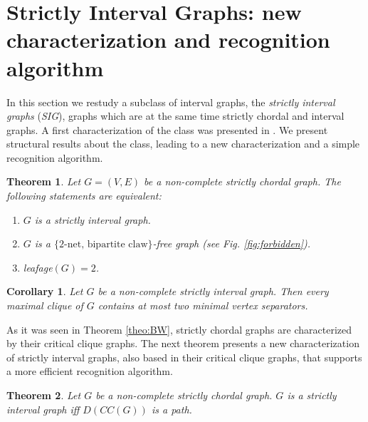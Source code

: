 \documentclass[preprint,12pt]{elsarticle}
\newtheorem{theorem}{Theorem}
\newtheorem{corollary}{Corollary}[theorem]
\begin{document}
\section{Strictly Interval Graphs: new characterization and recognition algorithm}

In this section we restudy a subclass of interval graphs, 
the \textit{strictly interval graphs} ({\em SIG}), graphs which are at the same time
strictly chordal and interval graphs.
A first characterization of the  class was presented in \cite{MW16}.
We present structural results about the class,
leading to a new characterization and a simple recognition algorithm.

\begin{theorem}\label{theo:charact-SIG1}{\rm \cite{MW16}}
Let  $G=(V,E)$ be a non-complete strictly chordal graph.
The following statements are equivalent: 
\begin{enumerate}
\item $G$ is a strictly interval graph.
\item $G$ is a $\{\textrm{2-net, bipartite claw}\}$-free graph (see Fig. \ref{fig:forbidden}).  
 \item  leafage$(G) =2$.
\end{enumerate}
\end{theorem} 

\begin{corollary}{\rm \label{cor:mc}}
Let $G$ be a non-complete strictly interval graph. 
Then every maximal clique of $G$ contains at most two minimal vertex separators.
\end{corollary}

As it was seen in Theorem \ref{theo:BW}, strictly chordal graphs are characterized 
by their critical clique graphs.
The next theorem presents  a new characterization of strictly interval graphs,
also based in their critical clique graphs,  that
supports a more efficient recognition algorithm.


\begin{theorem}\label{theo:charact-SIG2} 
Let $G$ be a non-complete strictly chordal graph. 
  $G$ is a   strictly interval graph iff
$D(CC(G))$ is a path.
\end{theorem}
\end{document}
